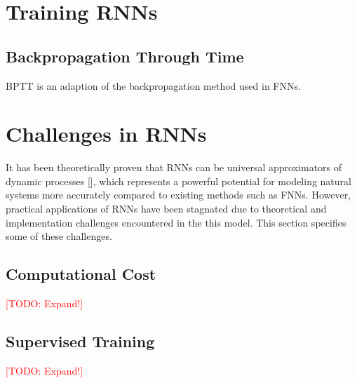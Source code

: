 \section{Training RNNs}

\subsection{Backpropagation Through Time}
BPTT is an adaption of the backpropagation method used in FNNs.

\section{Challenges in RNNs}
It has been theoretically proven that RNNs can be universal approximators of dynamic processes [\cite{Reference1}], which represents a powerful potential for modeling natural systems more accurately compared to existing methods such as FNNs. However, practical applications of RNNs have been stagnated due to theoretical and implementation challenges encountered in the this model. This section specifies some of these challenges. 

\subsection{Computational Cost}

\textcolor{red} {[TODO: Expand!] }

\subsection{Supervised Training}

\textcolor{red} {[TODO: Expand!] }



